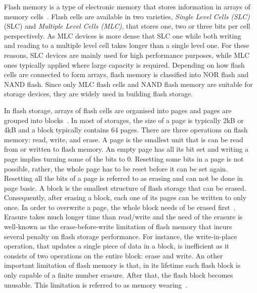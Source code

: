 Flash memory is a type of electronic memory that stores information in arrays of memory cells~\citep{Kono:2018}. 
Flash cells are available in two varieties, \textit{Single Level Cells (SLC)}(SLC) and \textit{Multiple Level Cells (MLC)}, that stores one, two or three bits per cell perspectively. 
As MLC devices is more dense that SLC one while both writing and reading to a multiple level cell takes longer than a single level one.
For these reasons, SLC devices are mainly used for high performance purposes, while MLC ones typically applied where large capacity is required. 
Depending on how flash cells are connected to form arrays, flash memory is classified into NOR flash and NAND flash.
Since only MLC flash cells and NAND flash memory are suitable for storage devices, they are widely used in building flash storage. 

In flash storage, arrays of flash cells are organised into pages and pages are grouped into blocks~\citep{Kono:2018}. 
In most of storages, the size of a page is typically 2kB or 4kB and a block typically contains 64 pages.
There are three operations on flash memory: read, write, and erase. 
A page is the smallest unit that is can be read from or written to flash memory.
An empty page has all its bit set and writing a page implies turning some of the bits to 0. 
Resetting some bits in a page is not possible, rather, the whole page has to be reset before it can be set again.
Resetting all the bits of a page is referred to as erasing and can not be done in page basic. 
A block is the smallest structure of flash storage that can be erased. 
Consequently, after erasing a block, each one of its pages can be written to only once. 
In order to overwrite a page, the whole block needs of be erased first~\citep{Kono:2018}. 
Erasure takes much longer time than read/write and the need of the erasure is well-known as the erase-before-write limitation of flash memory that incurs several penalty on flash storage performance.
For instance, the write-in-place operation, that updates a single piece of data in a block, is inefficient as it consists of two operations on the entire block: erase and write.
An other important limitation of flash memory is that, in its lifetime each flash block is only capable of a finite number erasure. 
After that, the flash block becomes unusable. This limitation is referred to as memory wearing~\citep{Kono:2018}.

